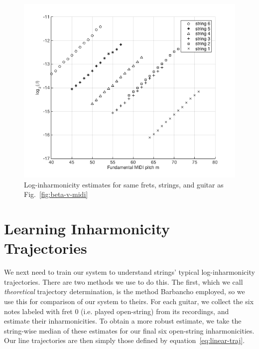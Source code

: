 \documentclass[12pt]{cmuthesis}
\begin{document}
\begin{figure}[!htbp] 
\centering
\includegraphics[scale=0.7]{log-beta-v-midi}
\caption{Log-inharmonicity estimates for same frets, strings, and guitar as Fig.~\ref{fig:beta-v-midi}}
\label{fig:log-beta-v-midi}
\end{figure}

\section{Learning Inharmonicity Trajectories}
We next need to train our system to understand strings' typical log-inharmonicity trajectories. There are two methods we use to do this. The first, which we call \textit{theoretical} trajectory determination, is the method Barbancho employed, so we use this for comparison of our system to theirs. For each guitar, we collect the six notes labeled with fret 0 (i.e. played open-string) from its recordings, and estimate their inharmonicities. To obtain a more robust estimate, we take the string-wise median of these estimates for our final six open-string inharmonicities. Our line trajectories are then simply those defined by equation~\eqref{eq:linear-traj}. 

\end{document}
